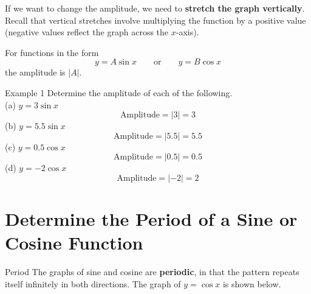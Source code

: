\documentclass[t,usenames,dvipsnames]{beamer}
\begin{document}
\begin{frame}
If we want to change the amplitude, we need to \textbf{stretch the graph vertically}. Recall that vertical stretches involve multiplying the function by a positive value (negative values reflect the graph across the $x$-axis).  \newline\\   \pause

For functions in the form
\[
y = A\sin x \qquad \text{or} \qquad y = B\cos x
\]
the amplitude is $|A|$.
\end{frame}

\begin{frame}{Example 1}
Determine the amplitude of each of the following.   \newline\\
(a) \quad $y = 3\sin x$ \pause
\[
\text{Amplitude} = |3| = 3
\]
\pause
(b) \quad $y = 5.5\sin x$   \pause
\[
\text{Amplitude} = |5.5| = 5.5
\]
\pause
(c) \quad $y = 0.5\cos x$   \pause
\[
\text{Amplitude} = |0.5| = 0.5
\]
\pause
(d) \quad $y = -2\cos x$    \pause
\[
\text{Amplitude} = |-2| = 2
\]
\end{frame} 

\section{Determine the Period of a Sine or Cosine Function}

\begin{frame}{Period}
The graphs of sine and cosine are \textbf{periodic}, in that the pattern repeats itself infinitely in both directions. The graph of $y = \cos x$ is shown below.    \newline\\ 

\begin{center}
\end{center}
\end{frame}
\end{document}
